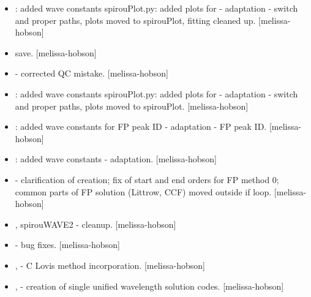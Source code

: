 \documentclass[a4paper,10pt,english]{report}
\begin{document}
\begin{itemize}
\item {} 
: added wave constants spirouPlot.py: added plots
for   -  adaptation -
 switch and proper paths, plots moved to spirouPlot,
fitting cleaned up. {[}melissa-hobson{]}

\item {} 
 save. {[}melissa-hobson{]}

\item {} 
 - corrected QC mistake. {[}melissa-hobson{]}

\item {} 
: added wave constants spirouPlot.py: added plots
for   -  adaptation -
 switch and proper paths, plots moved to spirouPlot.
{[}melissa-hobson{]}

\item {} 
: added wave constants for FP peak ID
 -  adaptation - FP peak ID. {[}melissa-
hobson{]}

\item {} 
: added wave constants  -
 adaptation. {[}melissa-hobson{]}

\item {} 
 - clarification of  creation; fix of start and
end orders for FP method 0; common parts of FP solution (Littrow, CCF)
moved outside if loop. {[}melissa-hobson{]}

\item {} 
, spirouWAVE2 - cleanup. {[}melissa-hobson{]}

\item {} 
 - bug fixes. {[}melissa-hobson{]}

\item {} 
,  - C Lovis method incorporation.
{[}melissa-hobson{]}

\item {} 
,  - creation of single unified
wavelength solution codes. {[}melissa-hobson{]}


\end{itemize}
\end{document}
